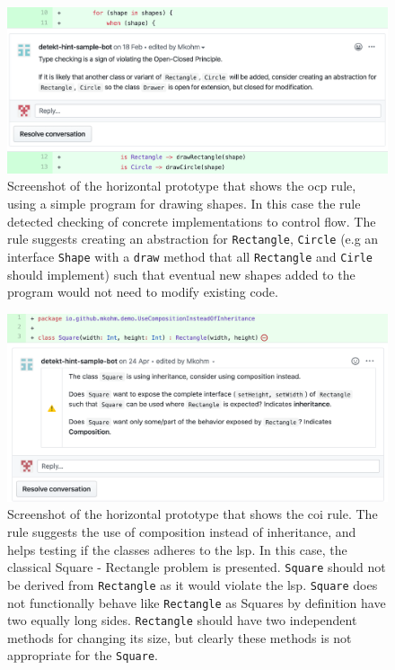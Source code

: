 \begin{figure}[h!]
    \centering
    \includegraphics[width=\textwidth]{images/comment_ocp2.png}
    \caption{Screenshot of the horizontal prototype that shows the \gls{ocp} rule, using a simple program for drawing shapes. In this case the rule detected checking of concrete implementations to control flow. The rule suggests creating an abstraction for \texttt{Rectangle}, \texttt{Circle} (e.g an interface \texttt{Shape} with a \texttt{draw} method that all \texttt{Rectangle} and \texttt{Cirle} should implement) such that eventual new shapes added to the program would not need to modify existing code. }
    \label{fig:ocp}
\end{figure}


\begin{figure}[h!]
    \centering
    \includegraphics[width=\textwidth]{images/horizontal-prototype-coh.png}
    \caption{Screenshot of the horizontal prototype that shows the \gls{coi} rule. The rule suggests the use of composition instead of inheritance, and helps testing if the classes adheres to the \gls{lsp}. In this case, the classical Square - Rectangle problem is presented. \texttt{Square} should not be derived from \texttt{Rectangle} as it would violate the \gls{lsp}. \texttt{Square} does not functionally behave like \texttt{Rectangle} as Squares by definition have two equally long sides. \texttt{Rectangle} should have two independent methods for changing its size, but clearly these methods is not appropriate for the \texttt{Square}. }
    \label{fig:liskov}
\end{figure}

